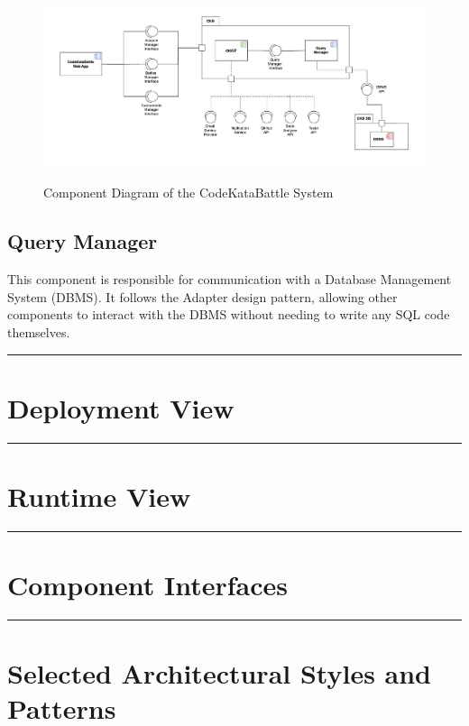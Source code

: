 \documentclass{Configuration_Files/Template}
\begin{document}
\begin{figure}[H]
\centering
\includegraphics[scale = 0.6]{DD_latex/Images/diagrams/Component_view.png}\\
\caption{Component Diagram of the CodeKataBattle System}
\end{figure}

\subsection{Query Manager}

This component is responsible for communication with a Database Management System (DBMS). It follows the Adapter design pattern, allowing other components to interact with the DBMS without needing to write any SQL code themselves.

{\color{bluepoli}\rule{\linewidth}{0.1pt}}

\section{Deployment View}

{\color{bluepoli}\rule{\linewidth}{0.1pt}}

\section{Runtime View}

{\color{bluepoli}\rule{\linewidth}{0.1pt}}

\section{Component Interfaces}

{\color{bluepoli}\rule{\linewidth}{0.1pt}}

\section{Selected Architectural Styles and Patterns}
\end{document}
